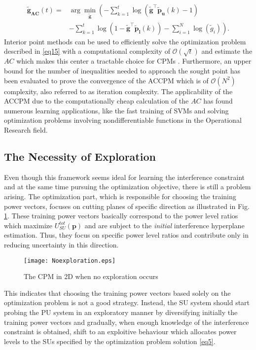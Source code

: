 \documentclass[journal]{IEEEtran}
\begin{document}
\begin{align}
\mathbf{\tilde{g}_{AC}}(t)=&\arg\min\limits_{\mathbf{\tilde{g}}}\left(-\sum\limits_{k=1}^{t}\log(\mathbf{\tilde{g}^\intercal}\mathbf{\tilde{p}_{u}}(k)-1) \nonumber \right.\\ &\left.-\sum\limits_{k=1}^{t}\log(1-\mathbf{\tilde{g}^\intercal}\mathbf{\tilde{p}_{l}}(k))-\sum\limits_{i = 1}^{N}\log(\tilde{g}_{i})\right)
\label{eq15}.
\end{align}
Interior point methods can be used to efficiently solve the optimization problem described in \eqref{eq15} with a computational complexity of $\mathcal{O}(\sqrt{t})$ and estimate the $AC$ which makes this center a tractable choice for CPMs \cite{biban91}. Furthermore, an upper bound for the number of inequalities needed to approach the sought point has been evaluated to prove the convergence of the ACCPM which is of $\mathcal{O}(N^{2})$ complexity, also referred to as iteration complexity. The applicability of the ACCPM due to the computationally cheap calculation of the $AC$ has found numerous learning applications, like the fast training of SVMs and solving optimization problems involving nondifferentiable functions in the Operational Research field.

\subsection{The Necessity of Exploration}

Even though this framework seems ideal for learning the interference constraint and at the same time pursuing the optimization objective, there is still a problem arising. The optimization part, which is responsible for choosing the training power vectors, focuses on cutting planes of specific direction as illustrated in Fig. \ref{fig2}. These training power vectors basically correspond to the power level ratios which maximize $U_{SU}^{tot}(\mathbf{p})$ and are subject to the \textit{initial} interference hyperplane estimation. Thus, they focus on specific power level ratios and contribute only in reducing uncertainty in this direction.

\begin{figure}[ht!]
\centering
\texttt{[image: Noexploration.eps]}
\caption{The CPM in 2D when no exploration occurs}
\label{fig2}
\end{figure}

This indicates that choosing the training power vectors based solely on the optimization problem is not a good strategy. Instead, the SU system should start probing the PU system in an exploratory manner by diversifying initially the training power vectors and gradually, when enough knowledge of the interference constraint is obtained, shift to an exploitive behaviour which allocates power levels to the SUs specified by the optimization problem solution \eqref{eq5}.
\end{document}
